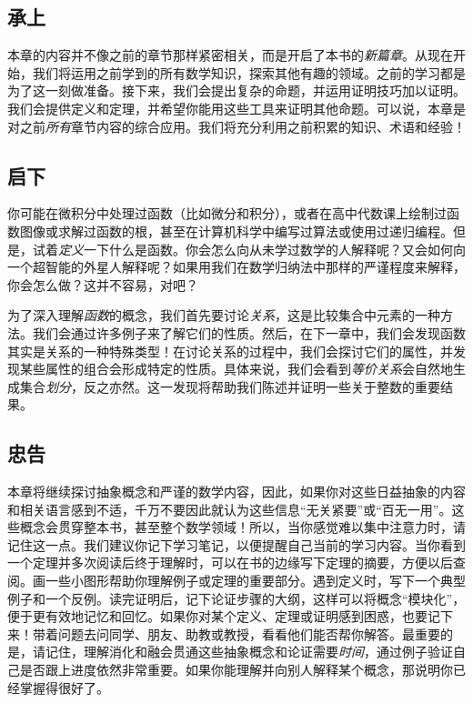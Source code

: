 \subsection{承上}

本章的内容并不像之前的章节那样紧密相关，而是开启了本书的\emph{新篇章}。从现在开始，我们将运用之前学到的所有数学知识，探索其他有趣的领域。之前的学习都是为了这一刻做准备。接下来，我们会提出复杂的命题，并运用证明技巧加以证明。我们会提供定义和定理，并希望你能用这些工具来证明其他命题。可以说，本章是对之前\emph{所有}章节内容的综合应用。我们将充分利用之前积累的知识、术语和经验！

\subsection{启下}

你可能在微积分中处理过函数（比如微分和积分），或者在高中代数课上绘制过函数图像或求解过函数的根，甚至在计算机科学中编写过算法或使用过递归编程。但是，试着\emph{定义}一下什么是函数。你会怎么向从未学过数学的人解释呢？又会如何向一个超智能的外星人解释呢？如果用我们在数学归纳法中那样的严谨程度来解释，你会怎么做？这并不容易，对吧？

为了深入理解\emph{函数}的概念，我们首先要讨论\emph{关系}，这是比较集合中元素的一种方法。我们会通过许多例子来了解它们的性质。然后，在下一章中，我们会发现函数其实是关系的一种特殊类型！在讨论关系的过程中，我们会探讨它们的属性，并发现某些属性的组合会形成特定的性质。具体来说，我们会看到\emph{等价关系}会自然地生成集合\emph{划分}，反之亦然。这一发现将帮助我们陈述并证明一些关于整数的重要结果。

\subsection{忠告}

本章将继续探讨抽象概念和严谨的数学内容，因此，如果你对这些日益抽象的内容和相关语言感到不适，千万不要因此就认为这些信息``无关紧要''或``百无一用''。这些概念会贯穿整本书，甚至整个数学领域！所以，当你感觉难以集中注意力时，请记住这一点。我们建议你记下学习笔记，以便提醒自己当前的学习内容。当你看到一个定理并多次阅读后终于理解时，可以在书的边缘写下定理的摘要，方便以后查阅。画一些小图形帮助你理解例子或定理的重要部分。遇到定义时，写下一个典型例子和一个反例。读完证明后，记下论证步骤的大纲，这样可以将概念``模块化''，便于更有效地记忆和回忆。如果你对某个定义、定理或证明感到困惑，也要记下来！带着问题去问同学、朋友、助教或教授，看看他们能否帮你解答。最重要的是，请记住，理解消化和融会贯通这些抽象概念和论证需要\emph{时间}，通过例子验证自己是否跟上进度依然非常重要。如果你能理解并向别人解释某个概念，那说明你已经掌握得很好了。
